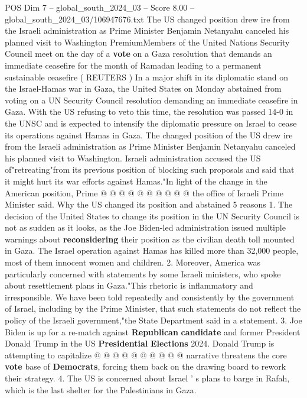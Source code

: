 \begin{textsample}{POS Dim 7 – global\_south\_2024\_03 – Score 8.00 – global\_south\_2024\_03/106947676.txt}  \label{ex:f7_pos_161}
The US changed position drew ire from the Israeli administration as Prime Minister Benjamin Netanyahu canceled his planned visit to Washington PremiumMembers of the United Nations Security Council meet on the day of a \textbf{vote} on a Gaza resolution that demands an immediate ceasefire for the month of Ramadan leading to a permanent sustainable ceasefire ( REUTERS ) In a major shift in its diplomatic stand on the Israel-Hamas war in Gaza, the United States on Monday abstained from voting on a UN Security Council resolution demanding an immediate ceasefire in Gaza.
With the US refusing to veto this time, the resolution was passed 14-0 in the UNSC and is expected to intensify the diplomatic pressure on Israel to cease its operations against Hamas in Gaza.
The changed position of the US drew ire from the Israeli administration as Prime Minister Benjamin Netanyahu canceled his planned visit to Washington.
Israeli administration accused the US of"retreating"from its previous position of blocking such proposals and said that it might hurt its war efforts against Hamas."In light of the change in the American position, Prime @ @ @ @ @ @ @ @ @ @ the office of Israeli Prime Minister said.
Why the US changed its position and abstained 5 reasons 1.
The decision of the United States to change its position in the UN Security Council is not as sudden as it looks, as the Joe Biden-led administration issued multiple warnings about \textbf{reconsidering} their position as the civilian death toll mounted in Gaza.
The Israel operation against Hamas has killed more than 32,000 people, most of them innocent women and children. 2.
Moreover, America was particularly concerned with statements by some Israeli ministers, who spoke about resettlement plans in Gaza."This rhetoric is inflammatory and irresponsible.
We have been told repeatedly and consistently by the government of Israel, including by the Prime Minister, that such statements do not reflect the policy of the Israeli government,"the State Department said in a statement. 3.
Joe Biden is up for a re-match against \textbf{Republican} \textbf{candidate} and former President Donald Trump in the US \textbf{Presidential} \textbf{Elections} 2024.
Donald Trump is attempting to capitalize @ @ @ @ @ @ @ @ @ @ narrative threatens the core \textbf{vote} base of \textbf{Democrats}, forcing them back on the drawing board to rework their strategy. 4.
The US is concerned about Israel ' s plans to barge in Rafah, which is the last shelter for the Palestinians in Gaza.

\end{textsample}
